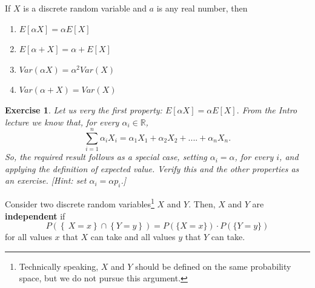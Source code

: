 \documentclass[smaller, handout]{beamer}\usepackage[]{graphicx}\usepackage[]{color}
\newtheorem{exercise}{Exercise}[section]
\newenvironment{stepenumerate}{\begin{enumerate}[<+->]}{\end{enumerate}}
\begin{document}
\begin{frame}{\secname}%
  If $X$ is a discrete random variable and $a$ is any real number, then

  \vspace{0.2cm}

  \begin{stepenumerate}
  \item $E\left[ \alpha X\right] =\alpha E\left[ X\right] $

  \item $E\left[ \alpha+X\right] =\alpha+E\left[ X\right] $

  \item $Var\left( \alpha X\right) =\alpha^{2}Var\left( X\right) $

  \item $Var\left( \alpha+X\right) =Var\left( X\right) $
  \end{stepenumerate}

  \begin{exercise}
  Let us very the first property:
  $
  E\left[ \alpha X \right] =\alpha E\left[ X\right].
  $
  From the Intro lecture we know that, for every $\alpha_i \in \mathbb{R}$,
  $$\sum_{i=1}^{n} \alpha_i X_{i} = \alpha_1 X_1 + \alpha_2 X_2 +....+ \alpha_n X_n.$$ So, the
  required result follows as a special case, setting $\alpha_i= \alpha$, for every $i$, and applying the definition
  of expected value. Verify this and the other properties as an exercise. [Hint: set $\alpha_i = \alpha p_i$.]
  \end{exercise}
\end{frame}

\begin{frame}{\secname}
  \begin{definition}
  Consider two discrete random variables\footnote{Technically speaking, $X$ and $Y$ should be defined on the same probability space,
  but we do not pursue this argument.} $X$ and $Y$. Then, $X$ and $Y$ are \textbf{independent} if%
  \begin{equation*}
  P \left(\left\{ \ X=x\right\} \cap \left\{ Y=y\right\} \right) =P \left(\{
  X=x\}\right) \cdot P \left(\{ Y=y \}\right)
  \end{equation*}
  for all values $x$ that $X$ can take and all values $y$ that $Y$ can take.
  \end{definition}
\end{frame}%
\end{document}
